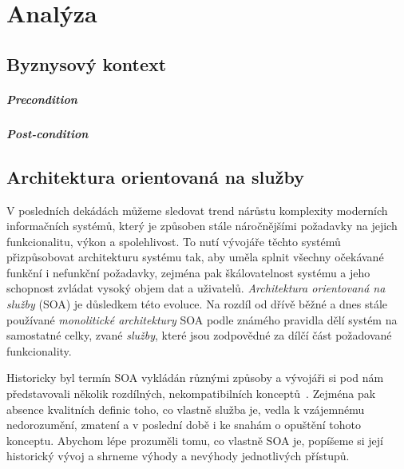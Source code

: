 \usepackage[T1]{fontenc}
\usepackage[utf8]{inputenc}
\usepackage{graphicx}


\chapter{Analýza}\label{ch:analyza}

\section{Byznysový kontext}

\paragraph{Precondition} %

\paragraph{Post-condition} %

\section{Architektura orientovaná na služby}

V posledních dekádách můžeme sledovat trend nárůstu komplexity
moderních informačních systémů, který je způsoben stále náročnějšími
požadavky na jejich funkcionalitu, výkon a spolehlivost. To nutí
vývojáře těchto systémů přizpůsobovat architekturu systému tak,
aby uměla splnit všechny očekávané funkční i nefunkční požadavky,
zejména pak škálovatelnost systému a jeho schopnost zvládat vysoký
objem dat a uživatelů. \textit{Architektura orientovaná na služby} (SOA) je
důsledkem této evoluce. Na rozdíl od dřívě běžné a dnes
stále používané \textit{monolitické architektury}
SOA podle známého pravidla 
dělí systém na samostatné celky, zvané \textit{služby}, které jsou
zodpovědné za dílčí část požadované funkcionality.

Historicky byl termín SOA vykládán různými způsoby a vývojáři si
pod nám představovali několik rozdílných, nekompatibilních
konceptů~\cite{fowler2005serviceorientedambiguity}.
Zejména pak absence kvalitních definic toho, co vlastně
služba je, vedla k vzájemnému nedorozumění, zmatení a v poslední
době i ke snahám o opuštění tohoto konceptu. Abychom lépe prozuměli tomu,
co vlastně SOA je, popíšeme si její historický vývoj a shrneme
výhody a nevýhody jednotlivých přístupů.

